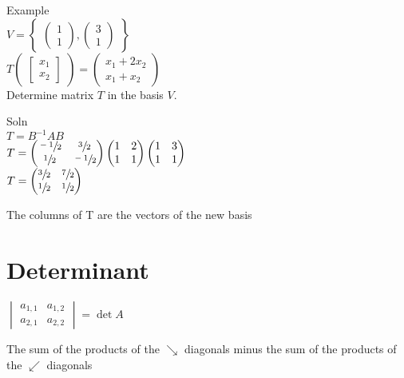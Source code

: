 \documentclass[10pt,letterpaper]{article}
\newenvironment{tight_item}
{\begin{itemize}
\setlength{\parskip}{0pt}
\setlength{\parsep}{0pt}
\setlength{\itemsep}{0pt}
\setlength{\parsep}{0pt}
\setlength{\topsep}{0pt}
\setlength{\partopsep}{0pt}
\setlength{\leftmargin}{0em}
\setlength{\labelwidth}{0em}
\setlength{\labelsep}{0em} }
{\end{itemize}}
\newenvironment{tight_desc}
{\begin{description}
\setlength{\parskip}{0pt}
\setlength{\parsep}{0pt}
\setlength{\itemsep}{0pt}
\setlength{\parsep}{0pt}
\setlength{\topsep}{0pt}
\setlength{\partopsep}{0pt}
\setlength{\leftmargin}{0em}
\setlength{\labelwidth}{0em}
\setlength{\labelsep}{1em} }
{\end{description}}
\begin{document}
{\begin{multicols*}{5}
\begin{tight_desc}
\item[Example] \hfill \\
$V = \begin{Bmatrix} \begin{pmatrix}1 \\ 1 \end{pmatrix}, \begin{pmatrix}3 \\ 1
\end{pmatrix} \end{Bmatrix}$ \\
$T \begin{pmatrix} \begin{bmatrix} x_{1} \\ x_{2} \end{bmatrix} \end{pmatrix} =
\begin{pmatrix} x_{1} + 2x_{2} \\ x_{1} + x_{2} \end{pmatrix}$\\
Determine matrix $T$ in the basis $V$.
\item[Soln] \hfill \\
$T = B^{-1}AB$ \\
$T = \begin{pmatrix} \sfrac{-1}{2} & \sfrac{3}{2} \\ \sfrac{1}{2} & \sfrac{-1}{2}
\end{pmatrix} \begin{pmatrix} 1 & 2 \\ 1 & 1 \end{pmatrix} \begin{pmatrix} 1 & 3
\\ 1 & 1 \end{pmatrix}$ \\
$T = \begin{pmatrix} \sfrac{3}{2} & \sfrac{7}{2} \\ \sfrac{1}{2} & \sfrac{1}{2}
\end{pmatrix}$
\end{tight_desc}
\begin{tight_item}
\item The columns of T are the vectors of the new basis
\end{tight_item}

\section{Determinant}
\begin{center}
$
\begin{vmatrix}
a_{1,1} & a_{1,2} \\
a_{2,1} & a_{2,2} \end{vmatrix} = \det{A}
$
\end{center}
\begin{tight_item}
\item The sum of the products of the $\searrow$ diagonals minus the sum of
the products of the $\swarrow$ diagonals
\end{tight_item}


\end{multicols*}}
\end{document}
